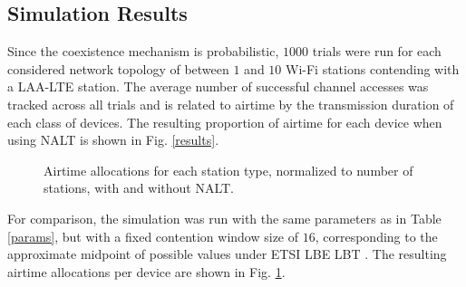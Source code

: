 \subsection{Simulation Results}
\label{sim-results}
Since the coexistence mechanism is probabilistic, $1000$ trials were run for each considered network topology of between $1$ and $10$ \mbox{Wi-Fi} stations contending with a \mbox{LAA-LTE} station.  The average number of successful channel accesses was tracked across all trials and is related to airtime by the transmission duration of each class of devices.  The resulting proportion of airtime for each device when using NALT is shown in Fig. \ref{results}.
\begin{figure}[t]
	\centering
	\hfil
	\caption{Airtime allocations for each station type, normalized to number of stations, with and without NALT.}
	\label{compresults}
\end{figure}
For comparison, the simulation was run with the same parameters as in Table \ref{params}, but with a fixed contention window size of $16$, corresponding to the approximate midpoint of possible values under ETSI LBE LBT \cite{3gpp}. The resulting airtime allocations per device are shown in Fig. \ref{compresults}.

